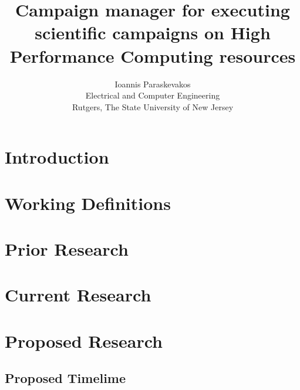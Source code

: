 

\title{Campaign manager for executing scientific campaigns on High Performance 
Computing resources}
\author{Ioannis Paraskevakos \\	Electrical and Computer Engineering \\
        Rutgers, The State University of New Jersey}
\date{}

\maketitle


\section{Introduction}


\section{Working Definitions}


\section{Prior Research}


\section{Current Research}


\section{Proposed Research}


\subsection{Proposed Timelime}




